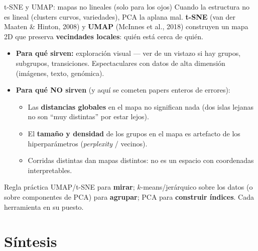 \documentclass{beamer}
\newcommand{\1}{\mathbb{I}}
\begin{document}
\begin{frame}{t-SNE y UMAP: mapas no lineales (solo para los ojos)}
\small
Cuando la estructura no es lineal (clusters curvos, variedades), PCA la aplana mal. \textbf{t-SNE} (van der Maaten \& Hinton, 2008) y \textbf{UMAP} (McInnes et al., 2018) construyen un mapa 2D que preserva \textbf{vecindades locales}: quién está cerca de quién.
\pause

\begin{itemize}\itemsep5pt
  \item \textbf{Para qué sirven:} exploración visual --- ver de un vistazo si hay grupos, subgrupos, transiciones. Espectaculares con datos de alta dimensión (imágenes, texto, genómica). \pause
  \item \textbf{Para qué NO sirven} (y aquí se cometen papers enteros de errores):
  \begin{itemize}\itemsep2pt
    \item Las \textbf{distancias globales} en el mapa no significan nada (dos islas lejanas no son ``muy distintas'' por estar lejos).
    \item El \textbf{tamaño y densidad} de los grupos en el mapa es artefacto de los hiperparámetros (\emph{perplexity} / vecinos).
    \item Corridas distintas dan mapas distintos: no es un espacio con coordenadas interpretables.
  \end{itemize} \pause
\end{itemize}

\begin{block}{Regla práctica}
UMAP/t-SNE para \textbf{mirar}; $k$-means/jerárquico sobre los datos (o sobre componentes de PCA) para \textbf{agrupar}; PCA para \textbf{construir índices}. Cada herramienta en su puesto.
\end{block}
\end{frame}


\section{Síntesis}
\begin{frame}[noframenumbering]
\tableofcontents[currentsection]
\end{frame}
\end{document}
